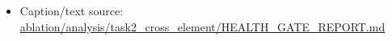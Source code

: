 \begin{itemize}[leftmargin=1.4em,noitemsep]
\item Caption/text source: \begingroup\scriptsize\url{ablation/analysis/task2_cross_element/HEALTH_GATE_REPORT.md}\endgroup
\end{itemize}

